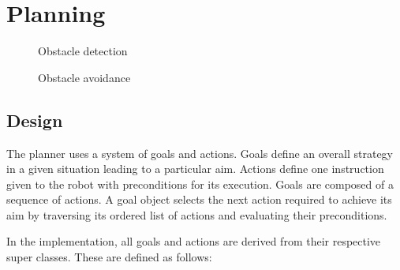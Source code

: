 \section{Planning}
\lstset{language=Python, showstringspaces=false}


\begin{figure}[h]
\centering

\caption{Obstacle detection}
\label{fig:obstacle_detection}
\end{figure}

\begin{figure}[h]
\centering

\caption{Obstacle avoidance}
\label{fig:obstacle_avoidance}
\end{figure}


\subsection{Design}

The planner uses a system of goals and actions. Goals define an overall strategy in a given situation leading to a particular aim. Actions define one instruction given to the robot with preconditions for its execution. Goals are composed of a sequence of actions. A goal object selects the next action required to achieve its aim by traversing its ordered list of actions and evaluating their preconditions.

In the implementation, all goals and actions are derived from their respective super classes. These are defined as follows:

